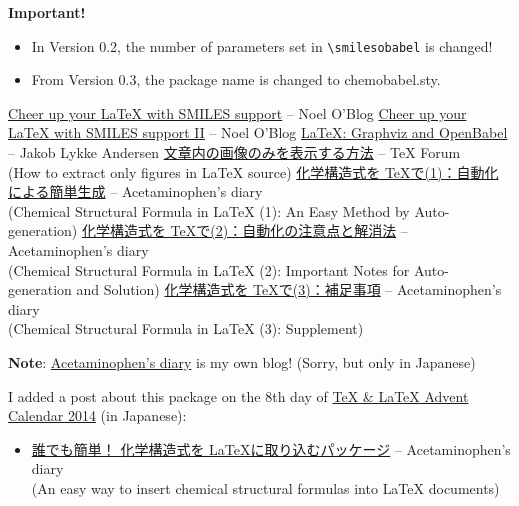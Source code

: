 \documentclass[12pt]{jsarticle}
\begin{document}
\textbf{Important!}
\begin{itemize}
\item In Version 0.2, the number of parameters set in \verb|\smilesobabel| is changed!
\item From Version 0.3, the package name is changed to \textsf{chemobabel.sty}.
\end{itemize}

\clearpage

\begin{thebibliography}{9}
\href{http://baoilleach.blogspot.jp/2012/03/cheer-up-your-latex-with-smiles-support.html}{Cheer up your {\LaTeX} with SMILES support} -- Noel O'Blog
\href{http://baoilleach.blogspot.jp/2012/04/cheer-up-your-latex-with-smiles-support.html}{Cheer up your {\LaTeX} with SMILES support II} -- Noel O'Blog
\href{http://imada.sdu.dk/~jlandersen/}{{\LaTeX}: Graphviz and OpenBabel} -- Jakob Lykke Andersen
\href{http://oku.edu.mie-u.ac.jp/tex/mod/forum/discuss.php?d=1411}{文章内の画像のみを表示する方法} -- {\TeX} Forum \\
(How to extract only figures in {\LaTeX} source)
\href{http://acetaminophen.hatenablog.com/entry/2014/11/02/130624}{化学構造式を \TeX で(1)：自動化による簡単生成} -- Acetaminophen's diary \\
(Chemical Structural Formula in {\LaTeX} (1): An Easy Method by Auto-generation)
\href{http://acetaminophen.hatenablog.com/entry/2014/11/02/130624}{化学構造式を \TeX で(2)：自動化の注意点と解消法} -- Acetaminophen's diary \\
(Chemical Structural Formula in {\LaTeX} (2): Important Notes for Auto-generation and Solution)
\href{http://acetaminophen.hatenablog.com/entry/2014/11/05/135927}{化学構造式を \TeX で(3)：補足事項} -- Acetaminophen's diary \\
(Chemical Structural Formula in {\LaTeX} (3): Supplement)
\end{thebibliography}

\noindent
\textbf{Note}: \href{http://acetaminophen.hatenablog.com/}{Acetaminophen's diary} is my own blog! (Sorry, but only in Japanese)

I added a post about this package on the 8th day of \href{http://www.adventar.org/calendars/553}{{\TeX} \& {\LaTeX} Advent Calendar 2014} (in Japanese):
\begin{itemize}
\item \href{http://acetaminophen.hatenablog.com/entry/2014/12/08/053519}{誰でも簡単！ 化学構造式を \LaTeX に取り込むパッケージ} -- Acetaminophen's diary \\
(An easy way to insert chemical structural formulas into {\LaTeX} documents)
\end{itemize}
\end{document}
